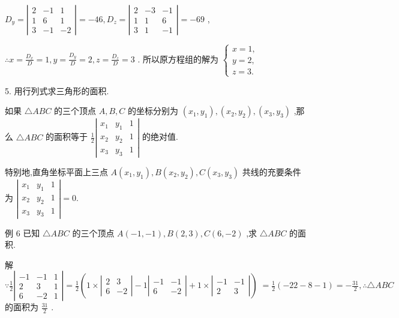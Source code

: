 \documentclass[10pt]{article}
\begin{document}
\({D}_{y} = \left| \begin{matrix} 2 &  - 1 & 1 \\  1 & 6 & 1 \\  3 &  - 1 &  - 2 \end{matrix}\right|  =  - {46},{D}_{z} = \left| \begin{matrix} 2 &  - 3 &  - 1 \\  1 & 1 & 6 \\  3 & 1 &  - 1 \end{matrix}\right|  =  - {69}\) ,

\(\therefore x = \frac{{D}_{x}}{D} = 1,y = \frac{{D}_{y}}{D} = 2,z = \frac{{D}_{z}}{D} = 3\) . 所以原方程组的解为 \(\left\{  \begin{array}{l} x = 1, \\  y = 2, \\  z = 3. \end{array}\right.\)

5. 用行列式求三角形的面积.

如果 \(\bigtriangleup {ABC}\) 的三个顶点 \(A,B,C\) 的坐标分别为 \(\left( {{x}_{1},{y}_{1}}\right) ,\left( {{x}_{2},{y}_{2}}\right) ,\left( {{x}_{3},{y}_{3}}\right)\) ,那么 \(\bigtriangleup {ABC}\) 的面积等于 \(\frac{1}{2}\left| \begin{array}{lll} {x}_{1} & {y}_{1} & 1 \\  {x}_{2} & {y}_{2} & 1 \\  {x}_{3} & {y}_{3} & 1 \end{array}\right|\) 的绝对值.

特别地,直角坐标平面上三点 \(A\left( {{x}_{1},{y}_{1}}\right) ,B\left( {{x}_{2},{y}_{2}}\right) ,C\left( {{x}_{3},{y}_{3}}\right)\) 共线的充要条件为 \(\left| \begin{array}{lll} {x}_{1} & {y}_{1} & 1 \\  {x}_{2} & {y}_{2} & 1 \\  {x}_{3} & {y}_{3} & 1 \end{array}\right|  = 0.\)

例 6 已知 \(\bigtriangleup {ABC}\) 的三个顶点 \(A\left( {-1, - 1}\right) ,B\left( {2,3}\right) ,C\left( {6, - 2}\right)\) ,求 \(\bigtriangleup {ABC}\) 的面积.

解 \(\because \frac{1}{2}\left| \begin{matrix}  - 1 &  - 1 & 1 \\  2 & 3 & 1 \\  6 &  - 2 & 1 \end{matrix}\right|  = \frac{1}{2}\left( {1 \times  \left| \begin{matrix} 2 & 3 \\  6 &  - 2 \end{matrix}\right|  - 1\left| \begin{matrix}  - 1 &  - 1 \\  6 &  - 2 \end{matrix}\right|  + 1 \times  \left| \begin{matrix}  - 1 &  - 1 \\  2 & 3 \end{matrix}\right| }\right) \; = \frac{1}{2}\left( {-{22} - 8 - 1}\right)  =  - \frac{31}{2},\therefore \bigtriangleup {ABC}\) 的面积为 \(\frac{31}{2}\) .
\end{document}
